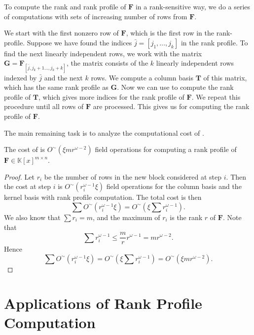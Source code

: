 To compute the rank and rank profile of $\mathbf{F}$ in a rank-sensitive
way, we do a series of computations with sets of increasing number
of rows from $\mathbf{F}$.

We start with the first nonzero row of $\mathbf{F}$, which is the
first row in the rank-profile. Suppose we have found the indices
$\bar{j}=\left[j_{1},\dots,j_{k}\right]$ in the rank profile. To
find the next linearly independent rows, we work with the matrix $\mathbf{G}=\mathbf{F}_{\left[\bar{j},j_{k}+1\dots,j_{k}+k\right]}$,
the matrix consists of the $k$ linearly independent rows indexed
by $\bar{j}$ and the next $k$ rows. We compute a column basis $\mathbf{T}$
of this matrix, which has the same rank profile as $\mathbf{G}$.
Now we can use 
to compute the rank profile of $\mathbf{T}$, which gives more indices
for the rank profile of $\mathbf{F}$. We repeat this procedure until
all rows of $\mathbf{F}$ are processed. This gives us 
for computing the rank profile of $\mathbf{F}$.



The main remaining task is to analyze the computational cost of . 
\begin{thm}
The cost of  is $O^{\sim}\left(\xi mr^{\omega-2}\right)$
field operations for computing a rank profile of $\mathbf{F}\in\mathbb{K}\left[x\right]^{m\times n}$.\end{thm}
\begin{proof}
Let $r_{i}$ be the number of rows in the new block considered at
step $i$. Then the cost at step $i$ is $O^{\sim}\left(r_{i}^{\omega-1}\xi\right)$
field operations for the column basis and the kernel basis with rank
profile computation. The total cost is then 
\[
\sum O^{\sim}\left(r_{i}^{\omega-1}\xi\right)=O^{\sim}\left(\xi\sum r_{i}^{\omega-1}\right).
\]
 We also know that $\sum r_{i}=m$, and the maximum of $r_{i}$ is
the rank $r$ of $\mathbf{F}$. Note that 
\[
\sum r_{i}^{\omega-1}\le\frac{m}{r}r^{\omega-1}=mr^{\omega-2}.
\]
 Hence 
\[
\sum O^{\sim}\left(r_{i}^{\omega-1}\xi\right)=O^{\sim}\left(\xi\sum r_{i}^{\omega-1}\right)=O^{\sim}\left(\xi mr^{\omega-2}\right).
\]

\end{proof}

\section{Applications of Rank Profile Computation}


